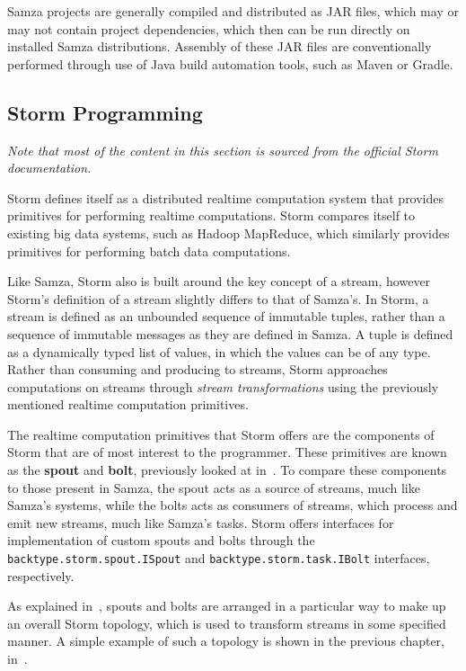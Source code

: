 Samza projects are generally compiled and distributed as JAR files, which may or may not contain project dependencies,
which then can be run directly on installed Samza distributions. Assembly of these JAR files are conventionally performed
through use of Java build automation tools, such as Maven or Gradle.



\subsection{Storm Programming} %
\label{sub:storm_programming}

\textit{Note that most of the content in this section is sourced from the official Storm documentation.}~\cite{Storm:doc}

Storm defines itself as a distributed realtime computation system that provides primitives for performing realtime
computations. Storm compares itself to existing big data systems, such as Hadoop MapReduce, which similarly provides
primitives for performing batch data computations.

Like Samza, Storm also is built around the key concept of a stream, however Storm's definition of a stream slightly
differs to that of Samza's. In Storm, a stream is defined as an unbounded sequence of immutable tuples, rather than a sequence
of immutable messages as they are defined in Samza. A tuple is defined as a dynamically typed list of values, in which
the values can be of any type. Rather than consuming and producing to streams, Storm approaches computations on streams
through \textit{stream transformations} using the previously mentioned realtime computation primitives.

The realtime computation primitives that Storm offers are the components of Storm that are of most interest to the programmer.
These primitives are known as the \textbf{spout} and \textbf{bolt}, previously looked at in~. To compare
these components to those present in Samza, the spout acts as a source of streams, much like Samza's systems, while the
bolts acts as consumers of streams, which process and emit new streams, much like Samza's tasks. Storm offers interfaces
for implementation of custom spouts and bolts through the \texttt{backtype.storm.spout.ISpout} and \texttt{backtype.storm.task.IBolt}
interfaces, respectively.

As explained in~, spouts and bolts are arranged in a particular way to make up an overall Storm topology,
which is used to transform streams in some specified manner. A simple example of such a topology is shown in the previous
chapter, in~.

